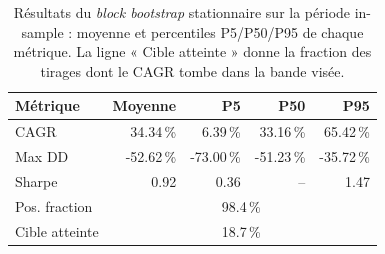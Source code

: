\begin{table}[H]
\centering
\caption{Résultats du \emph{block bootstrap} stationnaire sur la période in-sample : moyenne et percentiles P5/P50/P95 de chaque métrique. La ligne « Cible atteinte » donne la fraction des tirages dont le CAGR tombe dans la bande visée.}
\label{tab:bootstrap_percentiles}
\begin{tabular}{lrrrr}
\toprule
Métrique & Moyenne & P5 & P50 & P95 \\
\midrule
CAGR & 34.34\,\% & 6.39\,\% & 33.16\,\% & 65.42\,\% \\
Max DD & -52.62\,\% & -73.00\,\% & -51.23\,\% & -35.72\,\% \\
Sharpe & 0.92 & 0.36 & -- & 1.47 \\
Pos. fraction & \multicolumn{4}{c}{98.4\,\%} \\
Cible atteinte & \multicolumn{4}{c}{18.7\,\%} \\
\bottomrule
\end{tabular}
\end{table}
